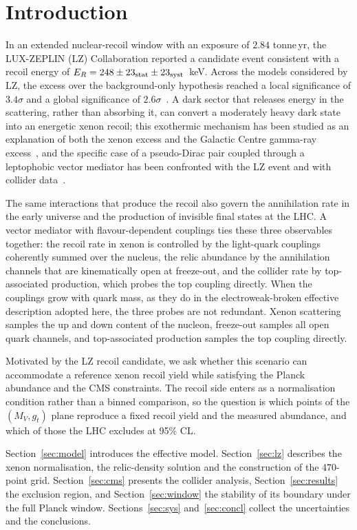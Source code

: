 \section{Introduction}

In an extended nuclear-recoil window with an exposure of $2.84$ tonne\,yr, the LUX-ZEPLIN (LZ) Collaboration reported a candidate event consistent with a recoil energy of $E_R=248\pm23_{\rm stat}\pm23_{\rm syst}$~keV. Across the models considered by LZ, the excess over the background-only hypothesis reached a local significance of $3.4\sigma$ and a global significance of $2.6\sigma$~\cite{LZ}. A dark sector that releases energy in the scattering, rather than absorbing it, can convert a moderately heavy dark state into an energetic xenon recoil; this exothermic mechanism has been studied as an explanation of both the xenon excess and the Galactic Centre gamma-ray excess~\cite{GHK}, and the specific case of a pseudo-Dirac pair coupled through a leptophobic vector mediator has been confronted with the LZ event and with collider data~\cite{DHX}.

The same interactions that produce the recoil also govern the annihilation rate in the early universe and the production of invisible final states at the LHC. A vector mediator with flavour-dependent couplings ties these three observables together: the recoil rate in xenon is controlled by the light-quark couplings coherently summed over the nucleus, the relic abundance by the annihilation channels that are kinematically open at freeze-out, and the collider rate by top-associated production, which probes the top coupling directly. When the couplings grow with quark mass, as they do in the electroweak-broken effective description adopted here, the three probes are not redundant. Xenon scattering samples the up and down content of the nucleon, freeze-out samples all open quark channels, and top-associated production samples the top coupling directly.

Motivated by the LZ recoil candidate, we ask whether this scenario can accommodate a reference xenon recoil yield while satisfying the Planck abundance and the CMS constraints. The recoil side enters as a normalisation condition rather than a binned comparison, so the question is which points of the $(M_V,g_t)$ plane reproduce a fixed recoil yield and the measured abundance, and which of those the LHC excludes at 95\% CL.

Section~\ref{sec:model} introduces the effective model. Section~\ref{sec:lz} describes the xenon normalisation, the relic-density solution and the construction of the 470-point grid. Section~\ref{sec:cms} presents the collider analysis, Section~\ref{sec:results} the exclusion region, and Section~\ref{sec:window} the stability of its boundary under the full Planck window. Sections~\ref{sec:sys} and~\ref{sec:concl} collect the uncertainties and the conclusions.
